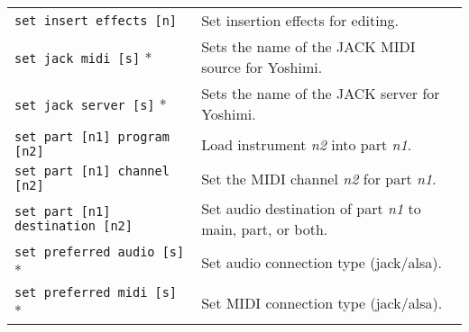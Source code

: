 \begin{table}[H]
\begin{tabular}{l l}
         \texttt{set insert effects [n]} &
            Set insertion effects for editing. \\

         \texttt{set jack midi [s]} * &
            Sets the name of the JACK MIDI source for Yoshimi. \\

         \texttt{set jack server [s]} * &
            Sets the name of the JACK server for Yoshimi. \\

         \texttt{set part [n1] program [n2]} &
            Load instrument \textsl{n2} into part \textsl{n1}. \\

         \texttt{set part [n1] channel [n2]} &
            Set the MIDI channel \textsl{n2} for part \textsl{n1}. \\

         \texttt{set part [n1] destination [n2]} &
            Set audio destination of part \textsl{n1}
            to main, part, or both. \\

         \texttt{set preferred audio [s]} * &
            Set audio connection type (jack/alsa). \\

         \texttt{set preferred midi [s]} * &
            Set MIDI connection type (jack/alsa). \\

      \end{tabular}
   \end{table}

